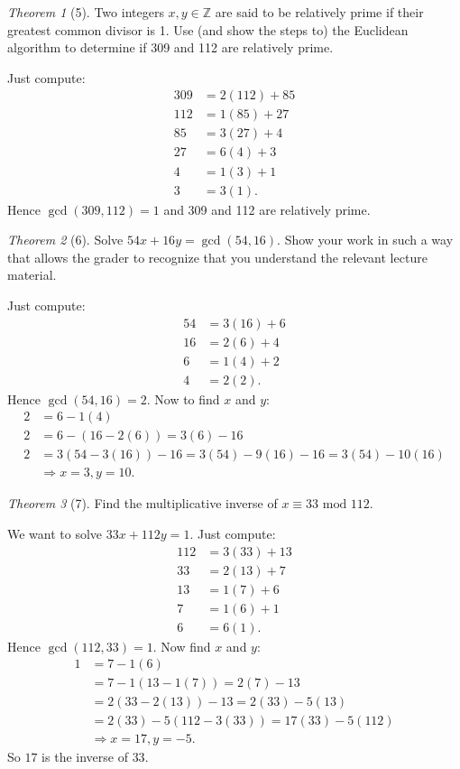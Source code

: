 \documentclass[12pt]{article}
\theoremstyle{remark}
\theoremstyle{named}
\newtheorem*{theorem}{Theorem}
\newcommand{\Z}{\mathbb Z}
\renewcommand{\mod}{\text{ mod }}
\begin{document}
\newpage
\begin{theorem}[5]
    Two integers \(x, y \in \Z\) are said to be relatively prime if their greatest common divisor is 1. Use (and show the steps to) the Euclidean algorithm to determine if 309 and 112 are relatively prime.
\end{theorem}

Just compute:
\begin{align*}
    309 &= 2(112) + 85 \\
    112 &= 1(85) + 27 \\
    85 &= 3(27) + 4 \\
    27 &= 6(4) + 3 \\
    4 &= 1(3) + 1 \\
    3 &= 3(1).
\end{align*}
Hence \(\gcd(309, 112) = 1\) and 309 and 112 are relatively prime.
\newline

\begin{theorem}[6]
    Solve \(54x + 16y = \gcd(54, 16)\). Show your work in such a way that allows the grader to recognize that you understand the relevant lecture material.
\end{theorem}

Just compute:
\begin{align*}
    54 &= 3(16) + 6 \\
    16 &= 2(6) + 4 \\
    6 &= 1(4) + 2 \\
    4 &= 2(2).
\end{align*}
Hence \(\gcd(54, 16) = 2\). Now to find \(x\) and \(y\):
\begin{align*}
    2 &= 6 - 1(4) \\
    2 &= 6 - (16 - 2(6)) = 3(6) - 16 \\
    2 &= 3(54 - 3(16)) - 16 = 3(54) - 9(16) - 16 = 3(54) - 10(16) \\
    &\Rightarrow x = 3, y = 10.
\end{align*}

\begin{theorem}[7]
    Find the multiplicative inverse of \(x \equiv 33 \mod 112\).
\end{theorem}

We want to solve \(33x + 112y = 1\). Just compute:
\begin{align*}
    112 &= 3(33) + 13 \\
    33 &= 2(13) + 7 \\
    13 &= 1(7) + 6 \\
    7 &= 1(6) + 1 \\
    6 &= 6(1).
\end{align*}
Hence \(\gcd(112, 33) = 1\). Now find \(x\) and \(y\):
\begin{align*}
    1 &= 7 - 1(6) \\
    &= 7 - 1(13 - 1(7)) = 2(7) - 13 \\
    &= 2(33 - 2(13)) - 13 = 2(33) - 5(13) \\
    &= 2(33) - 5(112 - 3(33)) = 17(33) - 5(112) \\
    &\Rightarrow x = 17, y = -5.
\end{align*}
So \(17\) is the inverse of \(33\). 
\end{document}
